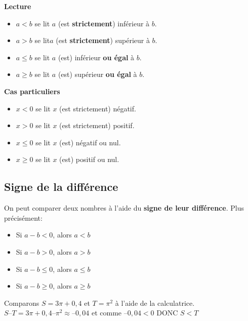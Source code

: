\documentclass[10pt]{article}
\begin{document}
{\begin{shaded}
\textbf{Lecture}
\begin{itemize}
\item $a<b$ se lit $a$ (est \textbf{strictement}) inférieur à $b$.
\item $a>b$ se lit$a$ (est \textbf{strictement}) supérieur à $b$.
\item $a \leqslant b$ se lit $a$ (est) inférieur \textbf{ou égal} à $b$.
\item $a \geqslant b$ se lit $a$ (est) supérieur
\textbf{ou égal} à $b$.
\end{itemize}
\end{shaded}

\begin{Rq} \textbf{Cas particuliers}
\begin{itemize}
\item $x<0$ se lit $x$ (est strictement)
négatif.
\item $x>0$ se lit $x$ (est strictement)
positif.
\item $x \leqslant 0$ se lit $x$ (est) négatif
ou nul.
\item $x \geqslant 0$ se lit $x$ (est) positif
ou nul.
\end{itemize}
\end{Rq}


\subsection{Signe de la différence}
\begin{shaded}
\begin{Pp}
On peut comparer deux nombres à l'aide du \textbf{signe de leur différence}.
Plus précisément: 
\begin{itemize}
\item Si $a-b<0$, alors $a<b$
\item Si $a-b>0$, alors $a>b$
\item Si $a-b\leqslant 0$, alors $a\leqslant b$
\item Si $a-b\geqslant 0$, alors $a\geqslant b$
\end{itemize}
\end{Pp}
\end{shaded}


\begin{Ex}
Comparons $S = 3\pi + 0,4$ et $T = \pi^2$ à l'aide de la calculatrice.\\
$S – T = 3\pi + 0,4 – \pi^2 \approx –0,04$ et comme $–0,04 < 0$\hspace{0.5cm} DONC \hspace{0.5cm}$S < T$
\end{Ex}
		
}
\end{document}
